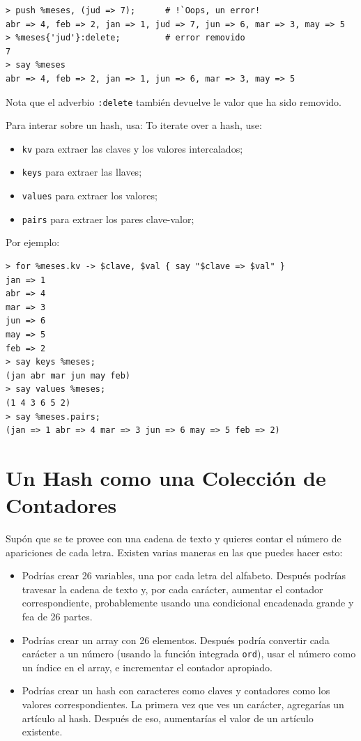 \begin{lstlisting}
> push %meses, (jud => 7);      # !`Oops, un error!
abr => 4, feb => 2, jan => 1, jud => 7, jun => 6, mar => 3, may => 5
> %meses{'jud'}:delete;         # error removido
7
> say %meses
abr => 4, feb => 2, jan => 1, jun => 6, mar => 3, may => 5
\end{lstlisting}

Nota que el adverbio {\tt :delete} también devuelve le valor que
ha sido removido.

Para interar sobre un hash, usa:
To iterate over a hash, use:

\begin{itemize}
\item {\tt kv} para extraer las claves y los valores intercalados;
\item {\tt keys} para extraer las llaves;
\item {\tt values} para extraer los valores;
\item {\tt pairs} para extraer los pares clave-valor;
\end{itemize}

Por ejemplo:

\begin{lstlisting}
> for %meses.kv -> $clave, $val { say "$clave => $val" }
jan => 1
abr => 4
mar => 3
jun => 6
may => 5
feb => 2
> say keys %meses;
(jan abr mar jun may feb)
> say values %meses;
(1 4 3 6 5 2)
> say %meses.pairs;
(jan => 1 abr => 4 mar => 3 jun => 6 may => 5 feb => 2)
\end{lstlisting}
%

\section{Un Hash como una Colección de Contadores}
\label{histogram}

Supón que se te provee con una cadena de texto y quieres contar
el número de apariciones de cada letra. Existen varias maneras
en las que puedes hacer esto:

\begin{itemize}

\item Podrías crear 26 variables, una por cada letra del 
alfabeto. Después podrías travesar la cadena de texto y, por cada
carácter, aumentar el contador correspondiente, probablemente
usando una condicional encadenada grande y fea de 26 partes.

\item Podrías crear un array con 26 elementos. Después podría
convertir cada carácter a un número (usando la función integrada
{\tt ord}), usar el número como un índice en el array, e 
incrementar el contador apropiado.

\item Podrías crear un hash con caracteres como claves y contadores
como los valores correspondientes. La primera vez que ves un carácter,
agregarías un artículo al hash. Después de eso, aumentarías el valor
de un artículo existente.
\end{itemize}

